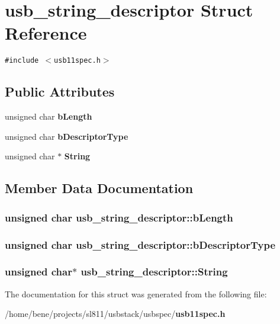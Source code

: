 \section{usb\_\-string\_\-descriptor Struct Reference}
\label{structusb__string__descriptor}
{\tt \#include $<$usb11spec.h$>$}

\subsection*{Public Attributes}
\begin{CompactItemize}
\item 
unsigned char {\bf b\-Length}
\item 
unsigned char {\bf b\-Descriptor\-Type}
\item 
unsigned char $\ast$ {\bf String}
\end{CompactItemize}


\subsection{Member Data Documentation}
\subsubsection{\setlength{\rightskip}{0pt plus 5cm}unsigned char {\bf usb\_\-string\_\-descriptor::b\-Length}}\label{structusb__string__descriptor_04c26a4b1d8cb3297db0fbecb88891aa}


\subsubsection{\setlength{\rightskip}{0pt plus 5cm}unsigned char {\bf usb\_\-string\_\-descriptor::b\-Descriptor\-Type}}\label{structusb__string__descriptor_8b150ec4cf85c3b64eaf60c5c750900e}


\subsubsection{\setlength{\rightskip}{0pt plus 5cm}unsigned char$\ast$ {\bf usb\_\-string\_\-descriptor::String}}\label{structusb__string__descriptor_db518f6c41c917d2b449a03e5caf81ed}




The documentation for this struct was generated from the following file:\begin{CompactItemize}
\item 
/home/bene/projects/sl811/usbstack/usbspec/{\bf usb11spec.h}\end{CompactItemize}
